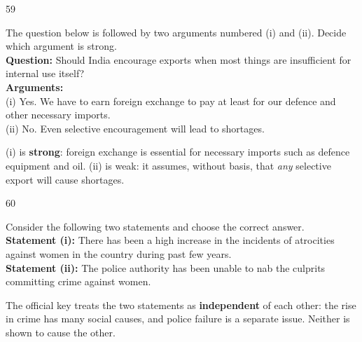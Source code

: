 \begin{question}{59}
{The question below is followed by two arguments numbered (i) and (ii). Decide which argument is strong.\\
\textbf{Question:} Should India encourage exports when most things are insufficient for internal use itself?\\
\textbf{Arguments:}\\
(i) Yes. We have to earn foreign exchange to pay at least for our defence and other necessary imports.\\
(ii) No. Even selective encouragement will lead to shortages.\par}
\begin{explain}
(i) is \textbf{strong}: foreign exchange is essential for necessary imports such as defence equipment and oil. (ii) is weak: it assumes, without basis, that \emph{any} selective export will cause shortages.
\end{explain}
\end{question}

\begin{question}{60}
{Consider the following two statements and choose the correct answer.\\
\textbf{Statement (i):} There has been a high increase in the incidents of atrocities against women in the country during past few years.\\
\textbf{Statement (ii):} The police authority has been unable to nab the culprits committing crime against women.\par}
\begin{explain}
The official key treats the two statements as \textbf{independent} of each other: the rise in crime has many social causes, and police failure is a separate issue. Neither is shown to cause the other.
\end{explain}
\end{question}
